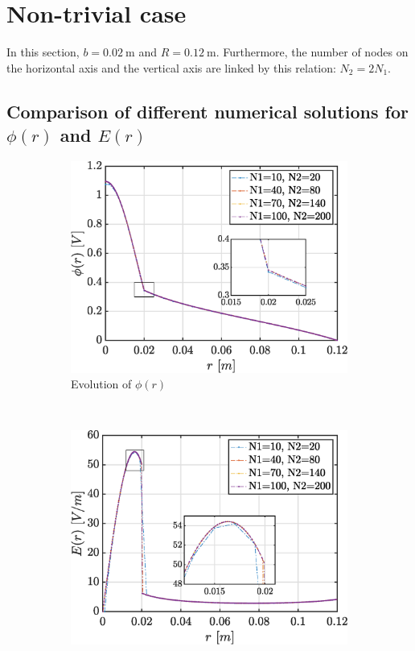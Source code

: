 \documentclass[a4paper,12pt,twoside]{article}
\newcommand{\bracket}[1]{\left(#1\right)}
\begin{document}
  \section{Non-trivial case}
  In this section, $b=\SI{0.02}{\m}$ and $R=\SI{0.12}{\m}$.
  Furthermore, the number of nodes on the horizontal axis and the vertical axis are linked by this relation: $N_2 = 2N_1$.

  \subsection{Comparison of different numerical solutions for $\phi\bracket{r}$ and $E\bracket{r}$} \lipsum[1-1]

  \begin{figure}[h]
    \centering
    \begin{subfigure}{0.45\textwidth}
      \includegraphics[width=\textwidth]{graphs/exd1-evoPhi}
      \caption{Evolution of $\phi\bracket{r}$}
      \label{fig:d1-evoPhi}
    \end{subfigure}
    ~
    \begin{subfigure}{0.45\textwidth}
      \includegraphics[width=\textwidth]{graphs/exd1-evoEr}

\end{subfigure}
\end{figure}
\end{document}
